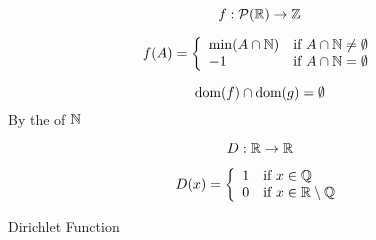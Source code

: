 \begin{frame}{}
  \begin{exampleblock}{}
    \[
      f: \mathcal{P}(\mathbb{R}) \to \mathbb{Z}
    \]

    \[
      f(A) = \left\{\begin{array}{ll}
        \min(A \cap \mathbb{N}) & \text{if } A \cap \mathbb{N} \neq \emptyset \\
          -1 & \text{if } A \cap \mathbb{N} = \emptyset
      \end{array}\right.
    \]
  \end{exampleblock}

  \pause
  \vspace{0.50cm}
  \begin{center}
    \[
      \text{dom}(f) \cap \text{dom}(g) = \emptyset
    \]
    By the  of $\mathbb{N}$
  \end{center}
\end{frame}

\begin{frame}{}
  \[
    D: \mathbb{R} \to \mathbb{R}
  \]

  \[
    D(x) = \left\{\begin{array}{ll}
      1 & \text{if } x \in \mathbb{Q} \\
      0 & \text{if } x \in \mathbb{R} \setminus \mathbb{Q}
    \end{array}\right.
  \]

  \vspace{0.60cm}
  \begin{center}
    {Dirichlet Function} \\[5pt]
  \end{center}
\end{frame}
